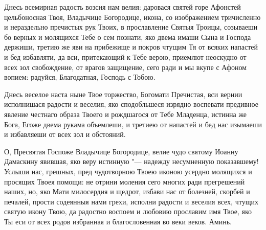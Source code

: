\begin{mymulticols}


Днесь всемирная радость возсия нам велия: даровася святей горе Афонстей цельбоносная Твоя, Владычице Богородице, икона, со изображением тричисленно и нераздельно пречистых рук Твоих, в прославление Святыя Троицы, созываеши бо верных и молящихся Тебе о сем познати, яко двема имаши Сына и Господа держиши, третию же яви на прибежище и покров чтущим Тя от всяких напастей и бед избавляти, да вси, притекающий к Тебе верою, приемлют неоскудно от всех зол свобождение, от врагов защищение, сего ради и мы вкупе с Афоном вопием: радуйся, Благодатная, Господь с Тобою.


Днесь веселое наста ныне Твое торжество, Богомати Пречистая, вси вернии исполнишася радости и веселия, яко сподобльшеся изрядно воспевати предивное явление честнаго образа Твоего и рождшагося от Тебе Младенца, истинна же Бога, Егоже двема рукама объемлеши, и третиею от напастей и бед нас изымаеши и избавляеши от всех зол и обстояний.


О, Пресвятая Госпоже Владычице Богородице, велие чудо святому Иоанну Дамаскину явившая, яко веру истинную "--- надежду несумненную показавшему! Услыши нас, грешных, пред чудотворною Твоею иконою усердно молящихся и просящих Твоея помощи: не отрини моления сего многих ради прегрешений наших, но, яко Мати милосердия и щедрот, избави нас от болезней, скорбей и печалей, прости содеянныя нами грехи, исполни радости и веселия всех, чтущих святую икону Твою, да радостно воспоем и любовию прославим имя Твое, яко Ты еси от всех родов избранная и благословенная во веки веков. Аминь.



\end{mymulticols}
